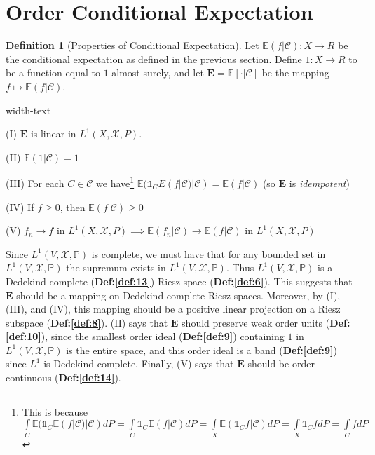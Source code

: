 \documentclass[letterpaper,10pt,oneside,onecolumn,reqno]{amsart}
\newcommand{\C}{\mathcal C}
\newcommand{\E}{\mathbb E}
\renewcommand{\P}{\mathbb P}
\newcommand{\X}{\mathcal X}
\newcommand{\one}{\mathds{1}}      %
\theoremstyle{definition}
\newtheorem{defn}{Definition}
\begin{document}
\part{Order Conditional Expectation}

\begin{defn}[Properties of Conditional Expectation]\label{def:1}
  Let $\E(f|\C) : X \to R$ be the conditional expectation as defined
  in the previous section. Define $1 : X \to R$ to be a function
  equal to $1$ almost surely, and let $\mathbf{E}=\E[\cdot|\C]$ be the
  mapping $f \mapsto \E(f|\C)$.
  \begin{deflist}{width-text}
  \item[(I)] $\mathbf{E}$ is linear in $L^1(X,\X,P)$.
  \item[(II)] $\E(1|\C) = 1$
  \item[(III)] For each $C \in \C$ we have\footnote{This is because
      $\int\limits_C\E(\one_C \E(f|\C)|\C)dP=\int\limits_C \one_C
      \E(f|\C)dP=\int\limits_X \E(\one_C f | \C)dP=\int\limits_X
      \one_C fdP=\int\limits_C fdP$ \label{fn:1}} $\E(\one_C
    E(f|\C)|\C) = \E(f|\C)$ (so $\mathbf{E}$ is \emph{idempotent})
  \item[(IV)] If $f \geq 0$, then $\E(f|\C) \geq 0$
  \item[(V)] $f_n \rightarrow f$ in $L^1(X,\X,P) \implies \E(f_n|\C)
    \rightarrow \E(f|\C)$ in $L^1(X,\X,P)$
  \end{deflist}
\end{defn}

\begin{framed}
  Since $L^1(V,\X,\P)$ is complete, we must have that for any bounded
  set in $L^1(V,\X,\P)$ the supremum exists in $L^1(V,\X,\P)$. Thus
  $L^1(V,\X,\P)$ is a Dedekind complete (\textbf{Def:\ref{def:13}})
  Riesz space (\textbf{Def:\ref{def:6}}). This suggests that
  $\mathbf{E}$ should be a mapping on Dedekind complete Riesz
  spaces. Moreover, by (I), (III), and (IV), this mapping should be a
  positive linear projection on a
  Riesz subspace (\textbf{Def:\ref{def:8}}). (II) says that
  $\mathbf{E}$ should preserve weak order units
  (\textbf{Def:\ref{def:10}}), since the smallest order ideal
  (\textbf{Def:\ref{def:9}}) containing $1$ in $L^1(V,\X,\P)$ is the
  entire space, and this order ideal is a band (\textbf{Def:\ref{def:9}})
  since $L^1$ is Dedekind complete. Finally, (V) says that
  $\mathbf{E}$ should be order continuous (\textbf{Def:\ref{def:14}}).
\end{framed}
\end{document}
